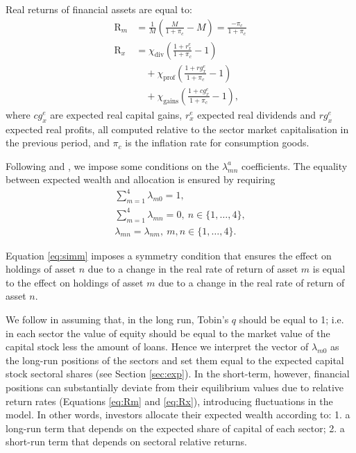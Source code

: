\documentclass[authoryear]{article}
\begin{document}
Real returns of financial assets are equal to:
\begin{align}
\text{R}_m &= \frac{1}{M}\left(\frac{M}{1+\pi_c} - M\right) = \frac{-\pi_c}{1 + \pi_c} \label{eq:Rm} \\
\text{R}_x &= \chi_\text{div}\left(\frac{1 + r_x^e}{1 + \pi_c} - 1\right) \nonumber\\
			 &\quad + \chi_\text{prof}\left(\frac{1 + rg_x^e}{1 + \pi_c} - 1\right) \nonumber\\
			 &\quad + \chi_\text{gains}\left(\frac{1 + cg_x^e}{1 + \pi_c} - 1\right), \label{eq:Rx}
\end{align}
where $cg_x^e$ are expected real capital gains, $r_x^e$ expected real dividends and $rg^e_x$ expected real profits, all computed relative to the sector market capitalisation in the previous period, and $\pi_c$ is the inflation rate for consumption goods.

Following \citet{Godley:2007} and \citet{Caiani2014}, we impose some conditions on the $\lambda^a_{mn}$ coefficients. The equality between expected wealth and allocation is ensured by requiring
\begin{gather}
\sum_{m=1}^4 \lambda_{m0} = 1,\\
\sum_{m=1}^4 \lambda_{mn} = 0,\> n\in\{1,\ldots,4\}, \\
\lambda_{mn} = \lambda_{nm},\> m,n\in\{1,\ldots,4\}. \label{eq:simm}
\end{gather}

Equation \ref{eq:simm} imposes a symmetry condition that ensures the effect on holdings of asset $n$ due to a change in the real rate of return of asset $m$ is equal to the effect on holdings of asset $m$ due to a change in the real rate of return of asset $n$.
			
We follow \citet{Tobin1969} in assuming that, in the long run, Tobin's $q$ should be equal to 1; i.e. in each sector the value of equity should be equal to the market value of the capital stock less the amount of loans. Hence we interpret the vector of $\lambda_{m0}$ as the long-run positions of the sectors and set them equal to the expected capital stock sectoral shares (see Section \ref{sec:exp}). In the short-term, however, financial positions can substantially deviate from their equilibrium values due to relative return rates (Equations \ref{eq:Rm} and \ref{eq:Rx}), introducing fluctuations in the model. In other words, investors allocate their expected wealth according to: 1. a long-run term that depends on the expected share of capital of each sector; 2. a short-run term that depends on sectoral relative returns. 
\end{document}
